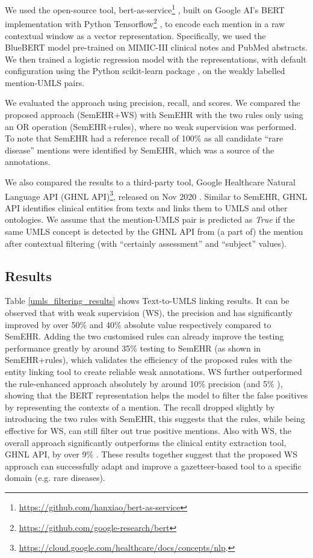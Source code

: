 \documentclass[letterpaper, 10 pt, conference]{ieeeconf}
\begin{document}
We used the open-source tool, bert-as-service\footnote{\url{https://github.com/hanxiao/bert-as-service}} \cite{xiao2019bertservice}, built on Google AI's BERT implementation with Python Tensorflow\footnote{\url{https://github.com/google-research/bert}} \cite{devlin-etal-2019-bert}, to encode each mention in a raw contextual window as a vector representation. Specifically, we used the BlueBERT \cite{peng2019transfer} model pre-trained on MIMIC-III clinical notes and PubMed abstracts. We then trained a logistic regression model with the representations, with default configuration using the Python scikit-learn package \cite{scikit-learn}, on the weakly labelled mention-UMLS pairs.

We evaluated the approach using precision, recall, and  scores. We compared the proposed approach (SemEHR+WS) with SemEHR with the two rules only using an OR operation (SemEHR+rules), where no weak supervision was performed. To note that SemEHR had a reference recall of 100\% as all candidate ``rare disease'' mentions were identified by SemEHR, which was a source of the annotations.

We also compared the results to a third-party tool, Google Healthcare Natural Language API (GHNL API)\footnote{\url{https://cloud.google.com/healthcare/docs/concepts/nlp}.}, released on Nov 2020 \cite{Bodnari2020}. Similar to SemEHR, GHNL API identifies clinical entities from texts and links them to UMLS and other ontologies. We assume that the mention-UMLS pair is predicted as \emph{True} if the same UMLS concept is detected by the GHNL API from (a part of) the mention after contextual filtering (with ``certainly assessment'' and ``subject'' values).

\subsection{Results}
Table \ref{umls_filtering_results} shows Text-to-UMLS linking results. It can be observed that with weak supervision (WS), the precision and  has significantly improved by over 50\% and 40\% absolute value respectively compared to SemEHR. Adding the two customised rules can already improve the testing performance greatly by around 35\% testing  to SemEHR (as shown in SemEHR+rules), which validates the efficiency of the proposed rules with the entity linking tool to create reliable weak annotations. WS further outperformed the rule-enhanced approach absolutely by around 10\% precision (and 5\% ), showing that the BERT representation helps the model to filter the false positives by representing the contexts of a mention. The recall dropped slightly by introducing the two rules with SemEHR, this suggests that the rules, while being effective for WS, can still filter out true positive mentions. Also with WS, the overall approach significantly outperforms the clinical entity extraction tool, GHNL API, by over 9\% . These results together suggest that the proposed WS approach can successfully adapt and improve a gazetteer-based tool to a specific domain (e.g. rare diseases).
\end{document}
